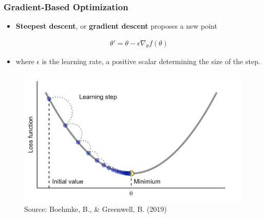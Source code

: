 \documentclass[
  shownotes,
  xcolor={svgnames},
  hyperref={colorlinks,citecolor=DarkBlue,linkcolor=DarkRed,urlcolor=DarkBlue}
  , aspectratio=169]{beamer}
\begin{document}
\begin{frame}[fragile]
\frametitle{Gradient-Based Optimization}

\begin{itemize}
  \item {\bf Steepest descent}, or {\bf gradient descent} proposes a new point

    \begin{align}
    \theta'=\theta-\epsilon \nabla_\theta f(\theta)
    \end{align}
\item where $\epsilon$ is the learning rate, a positive scalar determining the size of the step. 

\end{itemize}




\begin{figure}[H] \centering
  \centering
  \includegraphics[scale=0.25]{figures/step_size1.png}
  \\
  \tiny
  Source: Boehmke, B., \& Greenwell, B. (2019)
\end{figure}
 
  \end{frame}
\end{document}
